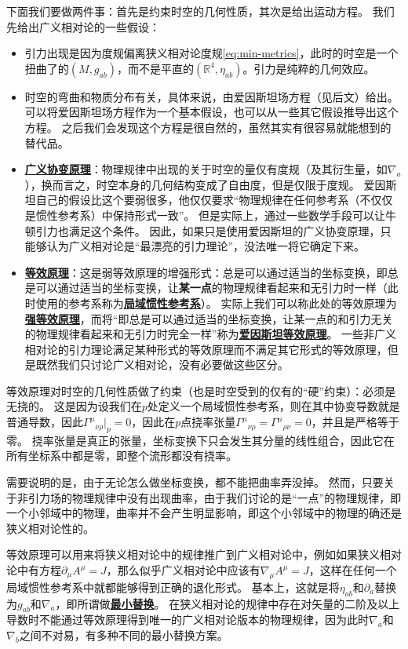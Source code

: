 \documentclass[hyperref, UTF8, a4paper]{ctexart}
\renewcommand{\emph}[1]{\textbf{#1}}
\newcommand*{\concept}[1]{\underline{\textbf{#1}}}
\begin{document}
下面我们要做两件事：首先是约束时空的几何性质，其次是给出运动方程。
我们先给出广义相对论的一些假设：
\begin{itemize}
    \item 引力出现是因为度规偏离狭义相对论度规\eqref{eq:min-metrics}，此时的时空是一个扭曲了的$(M, g_{ab})$，而不是平直的$(\mathbb{R}^4, \eta_{ab})$。引力是纯粹的几何效应。
    \item 时空的弯曲和物质分布有关，具体来说，由爱因斯坦场方程（见后文）给出。可以将爱因斯坦场方程作为一个基本假设，也可以从一些其它假设推导出这个方程。
    之后我们会发现这个方程是很自然的，虽然其实有很容易就能想到的替代品。
    \item \concept{广义协变原理}：物理规律中出现的关于时空的量仅有度规（及其衍生量，如$\nabla_a$），换而言之，时空本身的几何结构变成了自由度，但是仅限于度规。
    爱因斯坦自己的假设比这个要弱很多，他仅仅要求“物理规律在任何参考系（不仅仅是惯性参考系）中保持形式一致”。
    但是实际上，通过一些数学手段可以让牛顿引力也满足这个条件。
    因此，如果只是使用爱因斯坦的广义协变原理，只能够认为广义相对论是“最漂亮的引力理论”，没法唯一将它确定下来。
    \item \concept{等效原理}：这是弱等效原理的增强形式：总是可以通过适当的坐标变换，即总是可以通过适当的坐标变换，让\emph{某一点}的物理规律看起来和无引力时一样（此时使用的参考系称为\concept{局域惯性参考系}）。
    实际上我们可以称此处的等效原理为\concept{强等效原理}，而将“即总是可以通过适当的坐标变换，让某一点的和引力无关的物理规律看起来和无引力时完全一样”称为\concept{爱因斯坦等效原理}。
    一些非广义相对论的引力理论满足某种形式的等效原理而不满足其它形式的等效原理，但是既然我们只讨论广义相对论，没有必要做这些区分。
\end{itemize}

等效原理对时空的几何性质做了约束（也是时空受到的仅有的“硬”约束）：必须是无挠的。
这是因为设我们在$p$处定义一个局域惯性参考系，则在其中协变导数就是普通导数，因此$\Gamma^\mu{}_{\nu \rho}|_{p} = 0$，因此在$p$点挠率张量$\Gamma^\mu{}_{\nu \rho} = \Gamma^\mu{}_{\rho \nu} = 0$，并且是严格等于零。
挠率张量是真正的张量，坐标变换下只会发生其分量的线性组合，因此它在所有坐标系中都是零，即整个流形都没有挠率。

需要说明的是，由于无论怎么做坐标变换，都不能把曲率弄没掉。
然而，只要关于非引力场的物理规律中没有出现曲率，由于我们讨论的是“一点”的物理规律，即一个小邻域中的物理，曲率并不会产生明显影响，即这个小邻域中的物理的确还是狭义相对论性的。

等效原理可以用来将狭义相对论中的规律推广到广义相对论中，例如如果狭义相对论中有方程$\partial_\mu A^\mu = J$，那么似乎广义相对论中应该有$\nabla_\mu A^\mu = J$，这样在任何一个局域惯性参考系中就都能够得到正确的退化形式。
基本上，这就是将$\eta_{ab}$和$\partial_a$替换为$g_{ab}$和$\nabla_a$，即所谓做\concept{最小替换}。
在狭义相对论的规律中存在对矢量的二阶及以上导数时不能通过等效原理得到唯一的广义相对论版本的物理规律，因为此时$\nabla_a$和$\nabla_b$之间不对易，有多种不同的最小替换方案。
\end{document}

